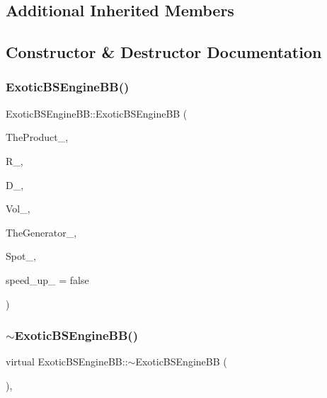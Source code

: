 \subsection*{Additional Inherited Members}


\subsection{Constructor \& Destructor Documentation}
\hypertarget{classExoticBSEngineBB_af8f524ef061a0ff7fda07a90ace2c794}{}\label{classExoticBSEngineBB_af8f524ef061a0ff7fda07a90ace2c794} 
\subsubsection{\texorpdfstring{Exotic\+B\+S\+Engine\+B\+B()}{ExoticBSEngineBB()}}
{\footnotesize\ttfamily Exotic\+B\+S\+Engine\+B\+B\+::\+Exotic\+B\+S\+Engine\+BB (\begin{DoxyParamCaption}\item[{const \hyperlink{classWrapper}{Wrapper}$<$ \hyperlink{classPathDependent}{Path\+Dependent} $>$ \&}]{The\+Product\+\_\+,  }\item[{const \hyperlink{classParameters}{Parameters} \&}]{R\+\_\+,  }\item[{const \hyperlink{classParameters}{Parameters} \&}]{D\+\_\+,  }\item[{const \hyperlink{classParameters}{Parameters} \&}]{Vol\+\_\+,  }\item[{const \hyperlink{classWrapper}{Wrapper}$<$ \hyperlink{classRandomBase}{Random\+Base} $>$ \&}]{The\+Generator\+\_\+,  }\item[{double}]{Spot\+\_\+,  }\item[{bool}]{speed\+\_\+up\+\_\+ = {\ttfamily false} }\end{DoxyParamCaption})}

\hypertarget{classExoticBSEngineBB_ab0cec2f243a827428ae1546b42acd57d}{}\label{classExoticBSEngineBB_ab0cec2f243a827428ae1546b42acd57d} 
\subsubsection{\texorpdfstring{$\sim$\+Exotic\+B\+S\+Engine\+B\+B()}{~ExoticBSEngineBB()}}
{\footnotesize\ttfamily virtual Exotic\+B\+S\+Engine\+B\+B\+::$\sim$\+Exotic\+B\+S\+Engine\+BB (\begin{DoxyParamCaption}{ }\end{DoxyParamCaption})\hspace{0.3cm}{\ttfamily [inline]}, {\ttfamily [virtual]}}



